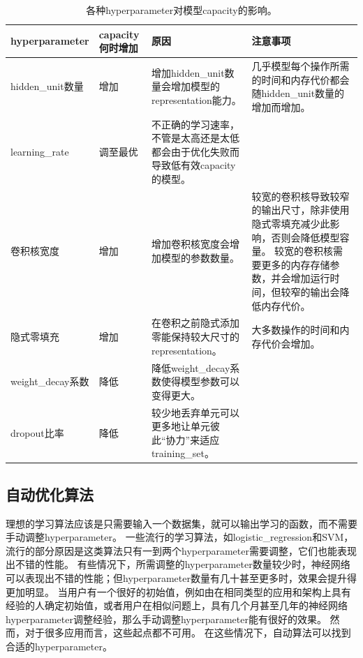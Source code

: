 \begin{table}
\centering
\small
\begin{tabular}{p{2.5cm}|p{1.5cm}|p{4.0cm}|p{4.0cm}}
\gls{hyperparameter} & \gls{capacity}何时增加 & 原因  & 注意事项 \\
\hline
\gls{hidden_unit}数量 &  增加          & 增加\gls{hidden_unit}数量会增加模型的\gls{representation}能力。 & 几乎模型每个操作所需的时间和内存代价都会随\gls{hidden_unit}数量的增加而增加。\\
\hline
\gls{learning_rate} & 调至最优 & 不正确的学习速率，不管是太高还是太低都会由于优化失败而导致低有效\gls{capacity}的模型。
 & \\
\hline
卷积核宽度 & 增加 & 增加卷积核宽度会增加模型的参数数量。&
较宽的卷积核导致较窄的输出尺寸，除非使用隐式零填充减少此影响，否则会降低模型容量。 
较宽的卷积核需要更多的内存存储参数，并会增加运行时间，但较窄的输出会降低内存代价。
\\
\hline
隐式零填充 & 增加 & 在卷积之前隐式添加零能保持较大尺寸的\gls{representation}。&
大多数操作的时间和内存代价会增加。\\
\hline
\gls{weight_decay}系数 & 降低 & 降低\gls{weight_decay}系数使得模型参数可以变得更大。
 & \\
\hline
\gls{dropout}比率 & 降低 & 较少地丢弃单元可以更多地让单元彼此``协力''来适应\gls{training_set}。
 & \\
\end{tabular}
\caption{各种\gls{hyperparameter}对模型\gls{capacity}的影响。}
\label{tab:hyperparameter_effect}
\end{table}



\subsection{自动优化算法}
\label{sec:automatic_hyperparameter_optimization_algorithms}
理想的学习算法应该是只需要输入一个数据集，就可以输出学习的函数，而不需要手动调整\gls{hyperparameter}。
一些流行的学习算法，如\gls{logistic_regression}和\gls{SVM}，流行的部分原因是这类算法只有一到两个\gls{hyperparameter}需要调整，它们也能表现出不错的性能。
有些情况下，所需调整的\gls{hyperparameter}数量较少时，神经网络可以表现出不错的性能；但\gls{hyperparameter}数量有几十甚至更多时，效果会提升得更加明显。
当用户有一个很好的初始值，例如由在相同类型的应用和架构上具有经验的人确定初始值，或者用户在相似问题上，具有几个月甚至几年的神经网络\gls{hyperparameter}调整经验，那么手动调整\gls{hyperparameter}能有很好的效果。
然而，对于很多应用而言，这些起点都不可用。
在这些情况下，自动算法可以找到合适的\gls{hyperparameter}。


